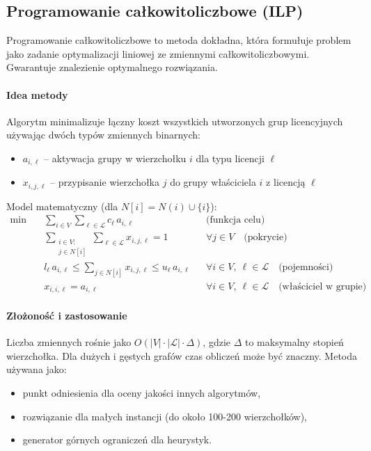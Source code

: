 \subsection{Programowanie całkowitoliczbowe (ILP)}\label{subsec:ilp}

Programowanie całkowitoliczbowe to metoda dokładna, która formułuje problem jako zadanie optymalizacji liniowej ze zmiennymi całkowitoliczbowymi. Gwarantuje znalezienie optymalnego rozwiązania.

\paragraph{Idea metody}
Algorytm minimalizuje łączny koszt wszystkich utworzonych grup licencyjnych używając dwóch typów zmiennych binarnych:
\begin{itemize}
  \item $a_{i,\ell}$ -- aktywacja grupy w wierzchołku $i$ dla typu licencji $\ell$
  \item $x_{i,j,\ell}$ -- przypisanie wierzchołka $j$ do grupy właściciela $i$ z licencją $\ell$
\end{itemize}

Model matematyczny (dla $N[i] = N(i) \cup \{i\}$):
\begin{align}
  \min\quad & \sum_{i\in V}\sum_{\ell\in\mathcal{L}} c_\ell\, a_{i,\ell}                    &  & \text{(funkcja celu)}                                                  \\[4pt]
            & \sum_{\substack{i\in V:                                                                                                                                   \\ j\in N[i]}}\sum_{\ell\in\mathcal{L}} x_{i,j,\ell} = 1 && \forall j\in V \quad \text{(pokrycie)} \\[2pt]
            & l_\ell\, a_{i,\ell} \le \sum_{j\in N[i]} x_{i,j,\ell} \le u_\ell\, a_{i,\ell} &  & \forall i\in V,\ \ell\in\mathcal{L} \quad \text{(pojemności)}          \\[2pt]
            & x_{i,i,\ell} = a_{i,\ell}                                                     &  & \forall i\in V,\ \ell\in\mathcal{L} \quad \text{(właściciel w grupie)}
\end{align}

\paragraph{Złożoność i zastosowanie}
Liczba zmiennych rośnie jako $O(|V| \cdot |\mathcal{L}| \cdot \Delta)$, gdzie $\Delta$ to maksymalny stopień wierzchołka. Dla dużych i gęstych grafów czas obliczeń może być znaczny. Metoda używana jako:
\begin{itemize}
  \item punkt odniesienia dla oceny jakości innych algorytmów,
  \item rozwiązanie dla małych instancji (do około 100-200 wierzchołków),
  \item generator górnych ograniczeń dla heurystyk.
\end{itemize}

